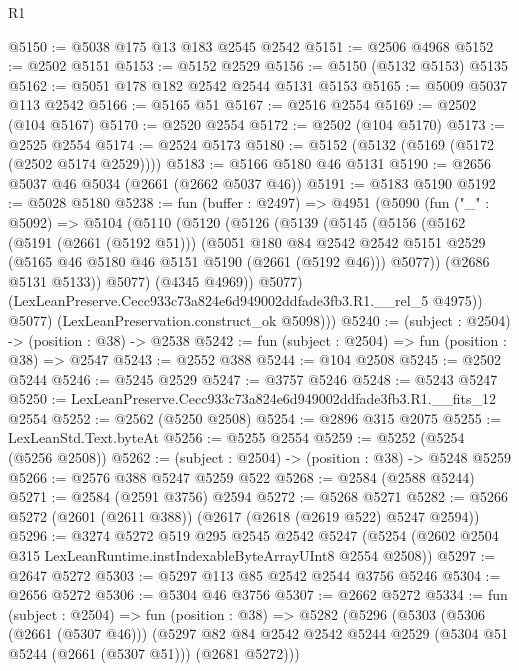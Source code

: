 \begin{lexlean}{R1}
\begin{coremodule}
@5150 := @5038 @175 @13 @183 @2545 @2542
@5151 := @2506 @4968
@5152 := @2502 @5151
@5153 := @5152 @2529
@5156 := @5150 (@5132 @5153) @5135
@5162 := @5051 @178 @182 @2542 @2544 @5131 @5153
@5165 := @5009 @5037 @113 @2542
@5166 := @5165 @51
@5167 := @2516 @2554
@5169 := @2502 (@104 @5167)
@5170 := @2520 @2554
@5172 := @2502 (@104 @5170)
@5173 := @2525 @2554
@5174 := @2524 @5173
@5180 := @5152 (@5132 (@5169 (@5172 (@2502 @5174 @2529))))
@5183 := @5166 @5180 @46 @5131
@5190 := @2656 @5037 @46 @5034 (@2661 (@2662 @5037 @46))
@5191 := @5183 @5190
@5192 := @5028 @5180
@5238 := fun (buffer : @2497) =>
  @4951
    (@5090
      (fun ("_" : @5092) =>
      @5104
        (@5110
          (@5120
            (@5126
              (@5139
                (@5145
                  (@5156
                    (@5162
                      (@5191 (@2661 (@5192 @51)))
                      (@5051
                        @180
                        @84
                        @2542
                        @2542
                        @5151
                        @2529
                        (@5165 @46 @5180 @46 @5151 @5190 (@2661 (@5192 @46)))
                        @5077))
                    (@2686 @5131 @5133))
                  @5077)
                (@4345 @4969))
              @5077)
            (LexLeanPreserve.Cecc933c73a824e6d949002ddfade3fb3.R1.__rel_5 @4975))
          @5077)
        (LexLeanPreservation.construct_ok @5098)))
@5240 := (subject : @2504) -> (position : @38) -> @2538
@5242 := fun (subject : @2504) => fun (position : @38) => @2547
@5243 := @2552 @388
@5244 := @104 @2508
@5245 := @2502 @5244
@5246 := @5245 @2529
@5247 := @3757 @5246
@5248 := @5243 @5247
@5250 := LexLeanPreserve.Cecc933c73a824e6d949002ddfade3fb3.R1.__fits_12 @2554
@5252 := @2562 (@5250 @2508)
@5254 := @2896 @315 @2075
@5255 := LexLeanStd.Text.byteAt
@5256 := @5255 @2554
@5259 := @5252 (@5254 (@5256 @2508))
@5262 := (subject : @2504) -> (position : @38) -> @5248 @5259
@5266 := @2576 @388 @5247 @5259 @522
@5268 := @2584 (@2588 @5244)
@5271 := @2584 (@2591 @3756) @2594
@5272 := @5268 @5271
@5282 := @5266 @5272 (@2601 (@2611 @388)) (@2617 (@2618 (@2619 @522) @5247 @2594))
@5296 := @3274
    @5272
    @519
    @295
    @2545
    @2542
    @5247
    (@5254 (@2602 @2504 @315 LexLeanRuntime.instIndexableByteArrayUInt8 @2554 @2508))
@5297 := @2647 @5272
@5303 := @5297 @113 @85 @2542 @2544 @3756 @5246
@5304 := @2656 @5272
@5306 := @5304 @46 @3756
@5307 := @2662 @5272
@5334 := fun (subject : @2504) =>
  fun (position : @38) =>
  @5282
    (@5296
      (@5303
        (@5306 (@2661 (@5307 @46)))
        (@5297 @82 @84 @2542 @2542 @5244 @2529 (@5304 @51 @5244 (@2661 (@5307 @51))) (@2681 @5272)))

\end{coremodule}
\end{lexlean}
